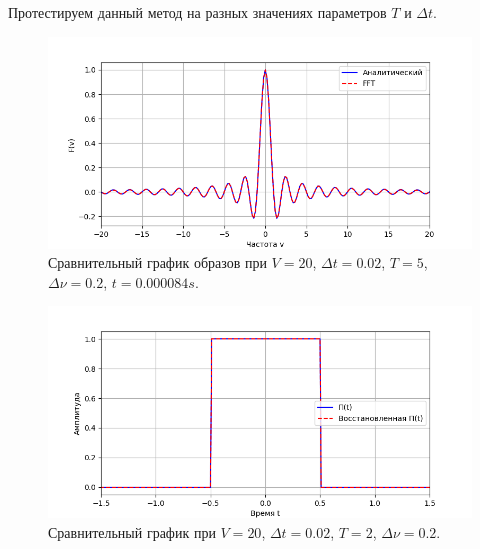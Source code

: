 \documentclass[a4paper]{article}
\begin{document}
Протестируем данный метод на разных значениях параметров $T$ и $\Delta t$.
\begin{figure}[H]
  \centering
  \includegraphics[width=\textwidth]{src/task_1_4/freq_5_0.01_20_0.2.png}
  \caption{Сравнительный график образов при $V=20$, $\Delta t=0.02$, $T=5$, $\Delta \nu=0.2$, $t=0.000084 s$.} 
\end{figure}
\begin{figure}[H]
  \centering
  \includegraphics[width=\textwidth]{src/task_1_4/time_5_0.01_20_0.2.png}
  \caption{Сравнительный график при $V=20$, $\Delta t=0.02$, $T=2$, $\Delta \nu=0.2$.} 
\end{figure}
\end{document}
